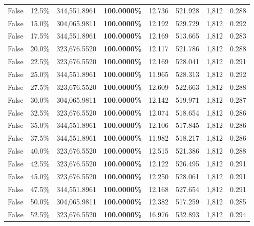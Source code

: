 \begin{table}[H]
\begin{tabular}{lllrllll}
\cline{1-8}
False & 12.5\% & 344,551.8961 & \bfseries \color{red} 100.0000\% & 12.736 & 521.928 & 1,812 & 0.288 \\
\cline{1-8}
False & 15.0\% & \color{red} 304,065.9811 & \bfseries \color{red} 100.0000\% & 12.192 & 529.729 & 1,812 & 0.292 \\
\cline{1-8}
False & 17.5\% & 344,551.8961 & \bfseries \color{red} 100.0000\% & 12.169 & 513.665 & 1,812 & 0.283 \\
\cline{1-8}
False & 20.0\% & 323,676.5520 & \bfseries \color{red} 100.0000\% & 12.117 & 521.786 & 1,812 & 0.288 \\
\cline{1-8}
False & 22.5\% & 323,676.5520 & \bfseries \color{red} 100.0000\% & 12.169 & 528.041 & 1,812 & 0.291 \\
\cline{1-8}
False & 25.0\% & 344,551.8961 & \bfseries \color{red} 100.0000\% & 11.965 & 528.313 & 1,812 & 0.292 \\
\cline{1-8}
False & 27.5\% & 323,676.5520 & \bfseries \color{red} 100.0000\% & 12.609 & 522.663 & 1,812 & 0.288 \\
\cline{1-8}
False & 30.0\% & \color{red} 304,065.9811 & \bfseries \color{red} 100.0000\% & 12.142 & 519.971 & 1,812 & 0.287 \\
\cline{1-8}
False & 32.5\% & 323,676.5520 & \bfseries \color{red} 100.0000\% & 12.074 & 518.654 & 1,812 & 0.286 \\
\cline{1-8}
False & 35.0\% & 344,551.8961 & \bfseries \color{red} 100.0000\% & 12.106 & 517.845 & 1,812 & 0.286 \\
\cline{1-8}
False & 37.5\% & 344,551.8961 & \bfseries \color{red} 100.0000\% & 11.982 & 518.217 & 1,812 & 0.286 \\
\cline{1-8}
False & 40.0\% & 323,676.5520 & \bfseries \color{red} 100.0000\% & 12.515 & 521.386 & 1,812 & 0.288 \\
\cline{1-8}
False & 42.5\% & 323,676.5520 & \bfseries \color{red} 100.0000\% & 12.122 & 526.495 & 1,812 & 0.291 \\
\cline{1-8}
False & 45.0\% & 323,676.5520 & \bfseries \color{red} 100.0000\% & 12.250 & 528.061 & 1,812 & 0.291 \\
\cline{1-8}
False & 47.5\% & 344,551.8961 & \bfseries \color{red} 100.0000\% & 12.168 & 527.654 & 1,812 & 0.291 \\
\cline{1-8}
False & 50.0\% & \color{red} 304,065.9811 & \bfseries \color{red} 100.0000\% & 12.382 & 517.259 & 1,812 & 0.285 \\
\cline{1-8}
False & 52.5\% & 323,676.5520 & \bfseries \color{red} 100.0000\% & 16.976 & 532.893 & 1,812 & 0.294 \\

\end{tabular}
\end{table}
